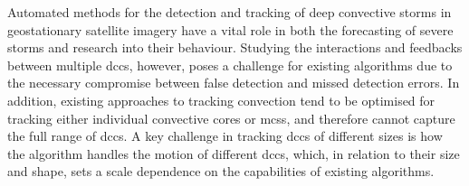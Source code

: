 

Automated methods for the detection and tracking of deep convective storms in geostationary satellite imagery have a vital role in both the forecasting of severe storms and research into their behaviour.
Studying the interactions and feedbacks between multiple \acrshort{dcc}s, however, poses a challenge for existing algorithms due to the necessary compromise between false detection and missed detection errors.
In addition, existing approaches to tracking convection tend to be optimised for tracking either individual convective cores or \acrshort{mcs}s, and therefore cannot capture the full range of \acrshort{dcc}s.
A key challenge in tracking \acrfull{dcc}s of different sizes is how the algorithm handles the motion of different \acrfull{dcc}s, which, in relation to their size and shape, sets a scale dependence on the capabilities of existing algorithms.

